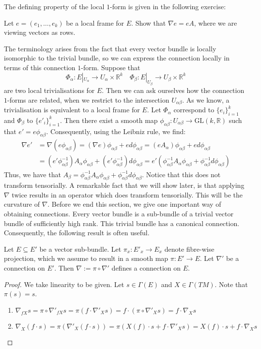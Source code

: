 The defining property of the local $1$-form is given in the following exercise:
\begin{exercise}\label{local}
  Let $e=(e_1,\dots,e_k)$ be a local frame for $E$. Show that $\nabla e=eA$, where we are viewing vectors as rows.
\end{exercise}
The terminology arises from the fact that every vector bundle is locally isomorphic to the trivial bundle, so we can express the connection locally in terms of this connection $1$-form. Suppose that
$$\Phi_\alpha:E|_{U_\alpha}\to U_\alpha\times\mathbb{R}^k\quad \Phi_\beta:E|_{U_\beta}\to U_\beta\times\mathbb{R}^k$$
are two local trivialisations for $E$. Then we can ask ourselves how the connection $1$-forms are related, when we restrict to the intersection $U_{\alpha\beta}$. As we know, a trivialisation is equivalent to a local frame for $E$. Let $\Phi_\alpha$ correspond to $\{e_i\}_{i=1}^k$ and $\Phi_\beta$ to $\{e'_i\}_{i=1}^k$. Then there exist a smooth map $\phi_{\alpha\beta}:U_{\alpha\beta}\to\text{GL}(k,\mathbb{R})$ such that $e'=e\phi_{\alpha\beta}$. Consequently, using the Leibniz rule, we find:
\begin{align*}
  \nabla e' &= \nabla (e\phi_{\alpha\beta})=(\nabla e)\phi_{\alpha\beta}+ed\phi_{\alpha\beta}=
  (eA_\alpha)\phi_{\alpha\beta}+ed\phi_{\alpha\beta} \\
            &= (e'\phi_{\alpha\beta}^{-1})A_\alpha\phi_{\alpha\beta}+(e'\phi_{\alpha\beta}^{-1})d\phi_{\alpha\beta}=e'(\phi_{\alpha\beta}^{-1}A_\alpha\phi_{\alpha\beta}+\phi_{\alpha\beta}^{-1}d\phi_{\alpha\beta})
\end{align*}
Thus, we have that $A_\beta=\phi_{\alpha\beta}^{-1}A_\alpha \phi_{\alpha\beta}+\phi_{\alpha\beta}^{-1}d\phi_{\alpha\beta}$. Notice that this does not transform tensorially. A remarkable fact that we will show later, is that applying $\nabla$ twice results in an operator which does transform tensorially. This will be the curvature of $\nabla$. Before we end this section, we give one important way of obtaining connections. Every vector bundle is a sub-bundle of a trivial vector bundle of sufficiently high rank. This trivial bundle has a canonical connection. Consequently, the following result is often useful.
\begin{proposition}\label{projection}
  Let $E\subseteq E'$ be a vector sub-bundle. Let $\pi_x:E'_x\to E_x$ denote fibre-wise projection, which we assume to result in a smooth map $\pi:E'\to E$. Let $\nabla'$ be a connection on $E'$. Then $\nabla:=\pi\circ\nabla'$ defines a connection on $E$.
\end{proposition}
\begin{proof}
  We take linearity to be given. Let $s\in\Gamma(E)$ and $X\in\Gamma(TM)$. Note that $\pi(s)=s$.
  \begin{enumerate}
    \item $\nabla_{fX}s=\pi\circ\nabla'_{fX}s=\pi(f\cdot\nabla'_Xs)=f\cdot(\pi\circ\nabla'_Xs)=f\cdot\nabla_Xs$
    \item $\nabla_X(f\cdot s)=\pi(\nabla'_X(f\cdot s))=\pi(X(f)\cdot s+f\cdot\nabla'_Xs)=X(f)\cdot s+f\cdot\nabla_Xs$
  \end{enumerate}
\end{proof}

